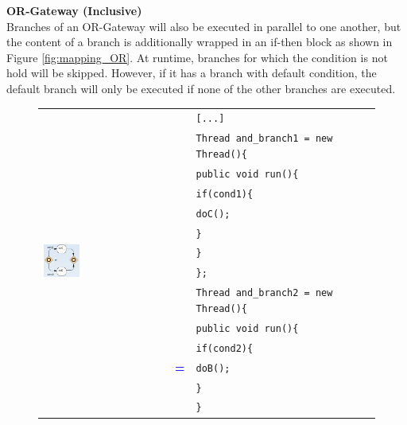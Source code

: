 \textbf{OR-Gateway (Inclusive)}\\
Branches of an OR-Gateway will also be executed in parallel to one another, but the content of a branch is additionally wrapped in an if-then block as shown in Figure \ref{fig:mapping_OR}. At runtime, branches for which the condition is not hold will be skipped. However, if it has a branch with default condition, the default branch will only be executed if none of the other branches are executed.
\begin{figure}[h]
\begin{tabularx}{\linewidth}{lcX}
	\multirow{22}{*}{\includegraphics[width=0.3\textwidth]{images/mapping/or-gateway.png}} &  & \texttt{[...]}\\
	& & \texttt{Thread and\_branch1 = new Thread()\{}\\
	& & \texttt{\hspace{10pt}public void run()\{}\\
	& & \texttt{\hspace{20pt}if(cond1)\{}\\
	& & \texttt{\hspace{30pt}doC();}\\
	& & \texttt{\hspace{20pt}\}}\\
	& & \texttt{\hspace{10pt}\}}\\
	& & \texttt{\};}\\
	& & \texttt{Thread and\_branch2 = new Thread()\{}\\
	& & \texttt{\hspace{10pt}public void run()\{}\\
	& & \texttt{\hspace{20pt}if(cond2)\{}\\
	& \textbf{\textcolor{blue}{=}} & \texttt{\hspace{30pt}doB();}\\
	& & \texttt{\hspace{20pt}\}}\\
	& & \texttt{\hspace{10pt}\}}\\

\end{tabularx}
\end{figure}
